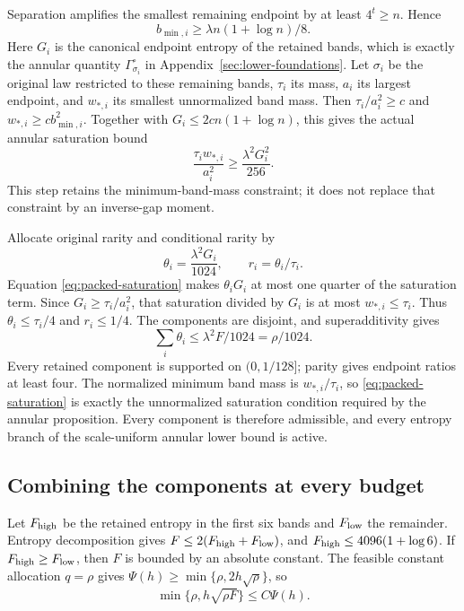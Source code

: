 Separation amplifies the smallest remaining endpoint by at least
$4^t\ge n$. Hence
\begin{equation}\label{eq:trimmed-minimum-gap}
 b_{\min,i}\ge\lambda n(1+\log n)/8.
\end{equation}
Here $G_i$ is the canonical endpoint entropy of the retained bands,
which is exactly the annular quantity $\Gamma_{\sigma_i}^{\circ}$
in Appendix~\ref{sec:lower-foundations}.
Let $\sigma_i$ be the original law restricted to these remaining bands,
$\tau_i$ its mass, $a_i$ its largest endpoint, and $w_{*,i}$ its smallest
unnormalized band mass. Then
$\tau_i/a_i^2\ge c$ and $w_{*,i}\ge c b_{\min,i}^2$.
Together with $G_i\le2cn(1+\log n)$, this gives the actual annular
saturation bound
\begin{equation}\label{eq:packed-saturation}
 \boxed{\quad
 \frac{\tau_iw_{*,i}}{a_i^2}
        \ge\frac{\lambda^2G_i^2}{256}.
 \quad}
\end{equation}
This step retains the minimum-band-mass constraint; it does not replace
that constraint by an inverse-gap moment.

Allocate original rarity and conditional rarity by
\begin{equation}\label{eq:packed-rarities}
 \theta_i=\frac{\lambda^2G_i}{1024},
 \qquad r_i=\theta_i/\tau_i.
\end{equation}
Equation \eqref{eq:packed-saturation} makes $\theta_iG_i$ at most one
quarter of the saturation term. Since $G_i\ge\tau_i/a_i^2$, that
saturation divided by $G_i$ is at most $w_{*,i}\le\tau_i$.
Thus $\theta_i\le\tau_i/4$ and $r_i\le1/4$.
The components are disjoint, and superadditivity gives
\[
 \sum_i\theta_i\le\lambda^2F/1024=\rho/1024.
\]
Every retained component is supported on $(0,1/128]$; parity gives
endpoint ratios at least four. The normalized minimum band mass is
$w_{*,i}/\tau_i$, so \eqref{eq:packed-saturation} is exactly the
unnormalized saturation condition required by the annular proposition.
Every component is therefore admissible, and every entropy branch of the
scale-uniform annular lower bound is active.

\subsection{Combining the components at every budget}

Let $F_{\rm high}$ be the retained entropy in the first six bands and
$F_{\rm low}$ the remainder. Entropy decomposition gives
$F\le2(F_{\rm high}+F_{\rm low})$, and
$F_{\rm high}\le4096(1+\log6)$.
If $F_{\rm high}\ge F_{\rm low}$, then $F$ is bounded by an absolute
constant. The feasible constant allocation $q=\rho$ gives
$\Psi(h)\ge\min\{\rho,2h\sqrt\rho\}$, so
\begin{equation}\label{eq:high-entropy-psi}
 \min\{\rho,h\sqrt{\rho F}\}\le C\Psi(h).
\end{equation}

